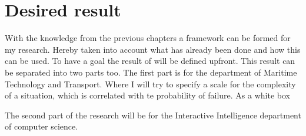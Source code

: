 \section{Desired result}
With the knowledge from the previous chapters a framework can be formed for my research. Hereby taken into account what has already been done and how this can be used. To have a goal the result of will be defined upfront. 
This result can be separated into two parts too. The first part is for the department of Maritime Technology and Transport. Where I will try to specify a scale for the complexity of a situation, which is correlated with te probability of failure. As a white box 

The second part of the research will be for the Interactive Intelligence department of computer science.